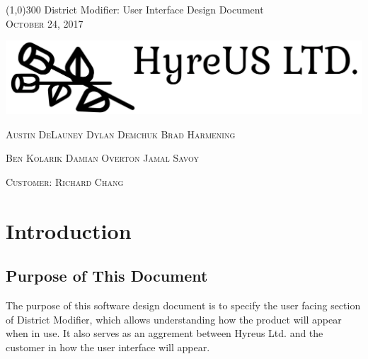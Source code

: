 \documentclass{article}
\begin{document}
\begin{titlepage}

	\begin{center}
 	\line(1,0){300} 
 	\huge{ District Modifier: User Interface Design Document} \\
 	
 	\vspace{1mm} 
 	\textsc{\normalsize October 24, 2017}
 	
 	\vspace{10mm}
	
	\hspace*{-2cm}   
	\includegraphics[scale=.25]{Logo.png}

	\vspace{10mm}
 
 	\textsc{\normalsize Austin DeLauney \quad Dylan Demchuk \quad Brad Harmening}
 	
 	\vspace{2mm}
 	
 	\textsc{\normalsize Ben Kolarik \quad Damian Overton \quad Jamal Savoy}
 
 	\vspace{2mm}
 	
 	\textsc{\normalsize Customer: Richard Chang}
 
 
 	\thispagestyle{empty}
 	
 \end{center}
 \end{titlepage}
 
\tableofcontents
\thispagestyle{empty}
\cleardoublepage

\setcounter{page}{1}

\section{Introduction}\label{sec:intro}

\subsection{Purpose of This Document}

\vspace{2.5mm}


The purpose of this software design document is to specify the user facing section of District Modifier, which allows understanding how the product will appear when in use. It also serves as an aggrement between Hyreus Ltd. and the customer in how the user interface will appear. 
\end{document}
